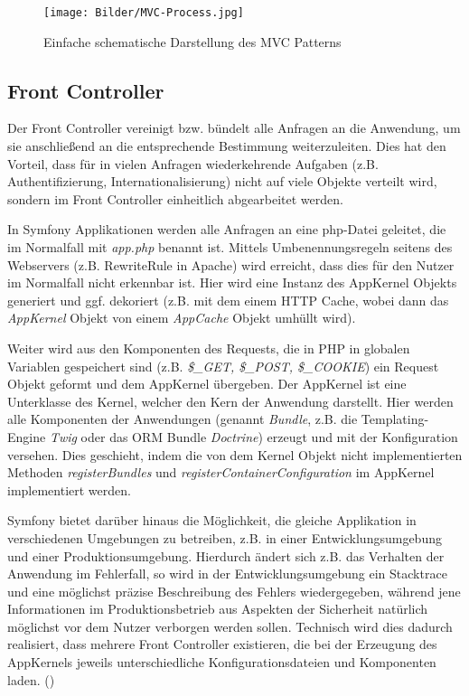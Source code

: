 \documentclass[12pt]{report}
\begin{document}
\begin{figure}[htp]
\centering
\texttt{[image: Bilder/MVC-Process.jpg]}
\caption{Einfache schematische Darstellung des MVC Patterns}
\label{}
\end{figure}

\subsection{Front Controller}
Der Front Controller vereinigt bzw. bündelt alle Anfragen an die Anwendung, um sie anschließend an die entsprechende Bestimmung weiterzuleiten. Dies hat den Vorteil, dass für in vielen Anfragen wiederkehrende Aufgaben (z.B. Authentifizierung, Internationalisierung) nicht auf viele Objekte verteilt wird, sondern im Front Controller einheitlich abgearbeitet werden.
\cite{FrontController}

In Symfony Applikationen werden alle Anfragen an eine php-Datei geleitet, die im Normalfall mit \emph{app.php} benannt ist. Mittels Umbenennungsregeln seitens des Webservers (z.B. RewriteRule in Apache) wird erreicht, dass dies für den Nutzer im Normalfall nicht erkennbar ist. Hier wird eine Instanz des AppKernel Objekts generiert und ggf. dekoriert (z.B. mit dem einem HTTP Cache, wobei dann das \emph{AppKernel} Objekt von einem \emph{AppCache} Objekt umhüllt wird). 

Weiter wird aus den Komponenten des Requests, die in PHP in globalen Variablen gespeichert sind (z.B. \emph{\$\_GET, \$\_POST, \$\_COOKIE}) ein Request Objekt geformt und dem AppKernel übergeben. Der AppKernel ist eine Unterklasse des Kernel, welcher den Kern der Anwendung darstellt. Hier werden alle Komponenten der Anwendungen (genannt \emph{Bundle}, z.B. die Templating-Engine \emph{Twig} oder das ORM Bundle \emph{Doctrine}) erzeugt und mit der Konfiguration versehen. Dies geschieht, indem die von dem Kernel Objekt nicht implementierten Methoden \emph{registerBundles} und \emph{registerContainerConfiguration} im AppKernel implementiert werden.

Symfony bietet darüber hinaus die Möglichkeit, die gleiche Applikation in verschiedenen Umgebungen zu betreiben, z.B. in einer Entwicklungsumgebung und einer Produktionsumgebung. Hierdurch ändert sich z.B. das Verhalten der Anwendung im Fehlerfall, so wird in der Entwicklungsumgebung ein Stacktrace und eine möglichst präzise Beschreibung des Fehlers wiedergegeben, während jene Informationen im Produktionsbetrieb aus Aspekten der Sicherheit natürlich möglichst vor dem Nutzer verborgen werden sollen. Technisch wird dies dadurch realisiert, dass mehrere Front Controller existieren, die bei der Erzeugung des AppKernels jeweils unterschiedliche Konfigurationsdateien und Komponenten laden.
(\cite{sf2:FrontController})
\end{document}
